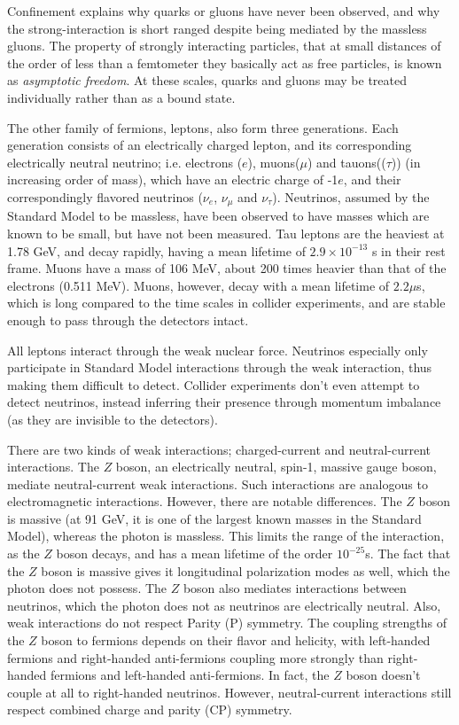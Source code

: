 \documentclass[11pt,a4paper,openright,twoside]{report}
\begin{document}
Confinement explains why quarks or gluons have never been observed, and why the strong-interaction is short ranged despite being mediated by the massless gluons. The property of strongly interacting particles, that at small distances of the order of less than a femtometer they basically act as free particles, is known as \textit{asymptotic freedom}. At these scales, quarks and gluons may be treated individually rather than as a bound state.

The other family of fermions, leptons, also form three generations. Each generation consists of an electrically charged lepton, and its corresponding electrically neutral neutrino; i.e. electrons ($e$), muons($\mu$) and tauons(($\tau$)) (in increasing order of mass), which have an electric charge of -1$e$, and their correspondingly flavored neutrinos ($\nu_e$, $\nu_{\mu}$ and $\nu_{\tau}$). Neutrinos, assumed by the Standard Model to be massless, have been observed to have masses \cite{nu1,nu2,nu3} which are known to be small, but have not been measured. Tau leptons are the heaviest at 1.78 GeV, and decay rapidly, having a mean lifetime of $2.9\times 10^{-13}$ s in their rest frame. Muons have a mass of 106 MeV, about 200 times heavier than that of the electrons (0.511 MeV). Muons, however, decay with a mean lifetime of $2.2 \mu$s, which is long compared to the time scales in collider experiments, and are stable enough to pass through the detectors intact.

All leptons interact through the weak nuclear force. Neutrinos especially only participate in Standard Model interactions through the weak interaction, thus making them difficult to detect. Collider experiments don't even attempt to detect neutrinos, instead inferring their presence through momentum imbalance (as they are invisible to the detectors). 

There are two kinds of weak interactions; charged-current and neutral-current interactions. The $Z$ boson, an electrically neutral, spin-1, massive gauge boson, mediate neutral-current weak interactions. Such interactions are analogous to electromagnetic interactions. However, there are notable differences. The $Z$ boson is massive (at 91 GeV, it is one of the largest known masses in the Standard Model), whereas the photon is massless. This limits the range of the interaction, as the $Z$ boson decays, and has a mean lifetime of the order $10^{-25}$s. The fact that the $Z$ boson is massive gives it longitudinal polarization modes\cite{quarks_and_leptons} as well, which the photon does not possess. The $Z$ boson also mediates interactions between neutrinos, which the photon does not as neutrinos are electrically neutral. Also, weak interactions do not respect Parity (P) symmetry. The coupling strengths of the $Z$ boson to fermions depends on their flavor and helicity, with left-handed fermions and right-handed anti-fermions coupling more strongly than right-handed fermions and left-handed anti-fermions. In fact, the $Z$ boson doesn't couple at all to right-handed neutrinos. However, neutral-current interactions still respect combined charge and parity (CP) symmetry.
\end{document}
